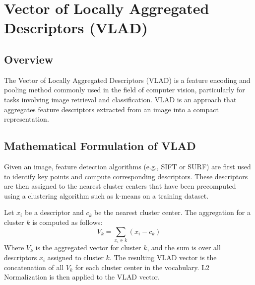 

\section*{Vector of Locally Aggregated Descriptors (VLAD)}

\subsection*{Overview}
The Vector of Locally Aggregated Descriptors (VLAD) is a feature encoding and pooling method commonly used in the field of computer vision, particularly for tasks involving image retrieval and classification. VLAD is an approach that aggregates feature descriptors extracted from an image into a compact representation.

    

\subsection*{Mathematical Formulation of VLAD}
Given an image, feature detection algorithms (e.g., SIFT or SURF) are first used to identify key points and compute corresponding descriptors. These descriptors are then assigned to the nearest cluster centers that have been precomputed using a clustering algorithm such as k-means on a training dataset.

Let $x_i$ be a descriptor and $c_k$ be the nearest cluster center. The aggregation for a cluster $k$ is computed as follows:
\begin{equation}
V_k = \sum_{x_i \in k} (x_i - c_k)
\end{equation}
Where $V_k$ is the aggregated vector for cluster $k$, and the sum is over all descriptors $x_i$ assigned to cluster $k$. The resulting VLAD vector is the concatenation of all $V_k$ for each cluster center in the vocabulary. L2 Normalization
is then applied to the VLAD vector.

